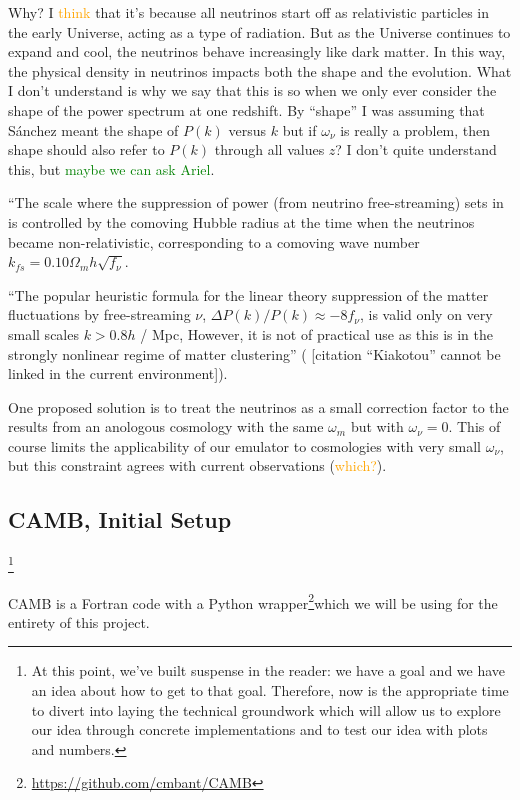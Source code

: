 \documentclass[11pt]{article}
\newcommand{\cbib}[1]
{\IfFileExists{biblatex.sty}
{\cite{#1}}
{[citation ``#1'' cannot be linked in the current environment]}}
\begin{document}
Why? I \textcolor{orange}{think} that it's because all neutrinos start off as
relativistic particles in the early Universe, acting as a type of radiation.
But as the Universe continues to expand and cool, the neutrinos behave
increasingly like dark matter.
In this way, the physical density in neutrinos impacts both the shape and the
evolution. What I don't understand is why we say that this is so when we
only ever consider the shape of the power spectrum at one redshift. By
``shape'' I was assuming that S\'{a}nchez meant the shape of $P(k)$ versus
$k$ but if $\omega_\nu$ is really a problem, then shape should also refer
to $P(k)$ through all values $z$? I don't quite understand this, but
\textcolor{green}{maybe we can ask Ariel}.

``The scale where the suppression of power (from neutrino free-streaming) sets
in is controlled by the comoving Hubble radius at the time when the neutrinos
became non-relativistic, corresponding to a comoving wave number
$k_{fs} = 0.10 \Omega_m h \sqrt{f_\nu}$.

``The popular heuristic formula for the linear theory suppression of the matter
fluctuations by free-streaming $\nu$, $\Delta P(k) / P(k) \approx -8 f_\nu$, is
valid only on very small scales $k > 0.8 h$ / Mpc, However, it is not of
practical use as this is in the strongly nonlinear regime of matter
clustering'' (\cbib{Kiakotou}).

One proposed solution is to treat the neutrinos as a small correction factor
to the results from an anologous cosmology with the same $\omega_m$ but with
$\omega_\nu = 0$. This of course limits the applicability of our emulator to
cosmologies with very small $\omega_\nu$, but this constraint agrees with
current observations (\textcolor{orange}{which?}).

\begin{centering}
\section{CAMB, Initial Setup}
\end{centering}
\footnote{
    At this point, we've built suspense in the reader: we have a goal and
    we have an idea about how to get to that goal. Therefore, now is the
    appropriate time to divert into laying the technical groundwork which
    will allow us to explore our idea through concrete implementations and
    to test our idea with plots and numbers.
}

CAMB is a Fortran code with a Python wrapper\footnote{
\url{https://github.com/cmbant/CAMB}
}which we will be using for the
entirety of this project.
\end{document}
